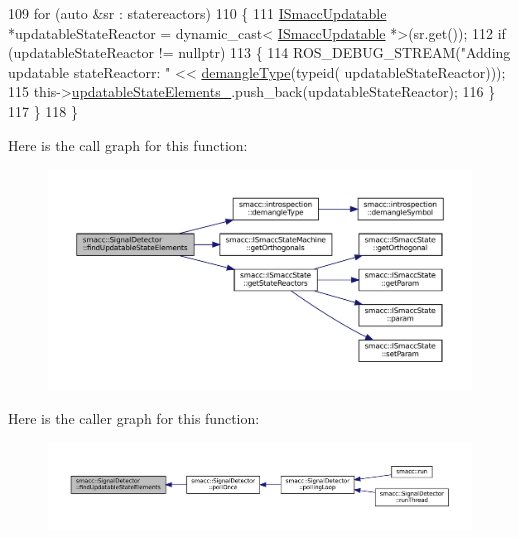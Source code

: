 \begin{DoxyCode}
109     \textcolor{keywordflow}{for} (\textcolor{keyword}{auto} &sr : statereactors)
110     \{
111         \hyperlink{classISmaccUpdatable}{ISmaccUpdatable} *updatableStateReactor = \textcolor{keyword}{dynamic\_cast<}
      \hyperlink{classISmaccUpdatable}{ISmaccUpdatable} *\textcolor{keyword}{>}(sr.get());
112         \textcolor{keywordflow}{if} (updatableStateReactor != \textcolor{keyword}{nullptr})
113         \{
114             ROS\_DEBUG\_STREAM(\textcolor{stringliteral}{"Adding updatable stateReactorr: "} << \hyperlink{namespacesmacc_1_1introspection_a670e39ccea29952859df4e2d0e45077b}{demangleType}(\textcolor{keyword}{typeid}(
      updatableStateReactor)));
115             this->\hyperlink{classsmacc_1_1SignalDetector_a07a5e7bb00c348435d954e22682fa610}{updatableStateElements\_}.push\_back(updatableStateReactor);
116         \}
117     \}
118 \}
\end{DoxyCode}
Here is the call graph for this function\+:
\nopagebreak
\begin{figure}[H]
\begin{center}
\leavevmode
\includegraphics[width=350pt]{classsmacc_1_1SignalDetector_a443234ebdf8cedd45cde725e64639dfe_cgraph}
\end{center}
\end{figure}
Here is the caller graph for this function\+:
\nopagebreak
\begin{figure}[H]
\begin{center}
\leavevmode
\includegraphics[width=350pt]{classsmacc_1_1SignalDetector_a443234ebdf8cedd45cde725e64639dfe_icgraph}
\end{center}
\end{figure}
\mbox{\label{classsmacc_1_1SignalDetector_a91ab3cd92d8095cdaf8610b50731f04b}} 
